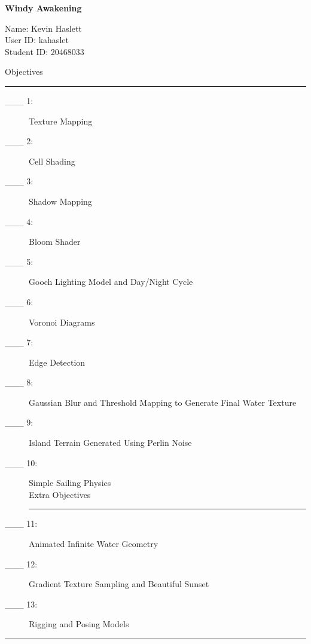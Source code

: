 \documentclass{article}
\newcommand\projecttitle{Windy Awakening}
\newcommand\myname{Kevin Haslett}
\newcommand\myuserid{kahaslet}
\newcommand\mystudentid{20468033}
\begin{document}
\newpage

{\huge \bf 
	\projecttitle 
}

\medskip
Name: \myname \\ 
User ID: \myuserid \\ 
Student ID: \mystudentid 

\bigskip
{\Large Objectives}

\hrule
\begin{description}
        \item[\_\_\_ 1:]
          Texture Mapping

        \item[\_\_\_ 2:]
		  Cell Shading

        \item[\_\_\_ 3:]
		  Shadow Mapping
			
        \item[\_\_\_ 4:]
		  Bloom Shader

        \item[\_\_\_ 5:]
		  Gooch Lighting Model and Day/Night Cycle

        \item[\_\_\_ 6:]
	      Voronoi Diagrams

        \item[\_\_\_ 7:]
		  Edge Detection

        \item[\_\_\_ 8:]
		  Gaussian Blur and Threshold Mapping to Generate Final Water Texture

        \item[\_\_\_ 9:]
		  Island Terrain Generated Using Perlin Noise

        \item[\_\_\_ 10:]
		  Simple Sailing Physics\\

		{\Large Extra Objectives}		    
		\hrule
		  
        \item[\_\_\_ 11:]
		  Animated Infinite Water Geometry
		  
        \item[\_\_\_ 12:]
		  Gradient Texture Sampling and Beautiful Sunset
		  
        \item[\_\_\_ 13:]
		  Rigging and Posing Models

\end{description}

\hrule
\end{document}
